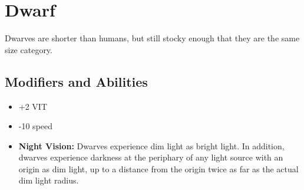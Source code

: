 \section{Dwarf}\label{dwarf}
Dwarves are shorter than humans, but still stocky enough that they are the same
size category.

\subsection{Modifiers and Abilities}
\begin{itemize}
    \item +2 VIT
    \item -10 speed
    \item \textbf{Night Vision:} Dwarves experience dim light as bright light.
        In addition, dwarves experience darkness at the periphary of any
        light source with an origin as dim light, up to a distance from the
        origin twice as far as the actual dim light radius.
\end{itemize}
